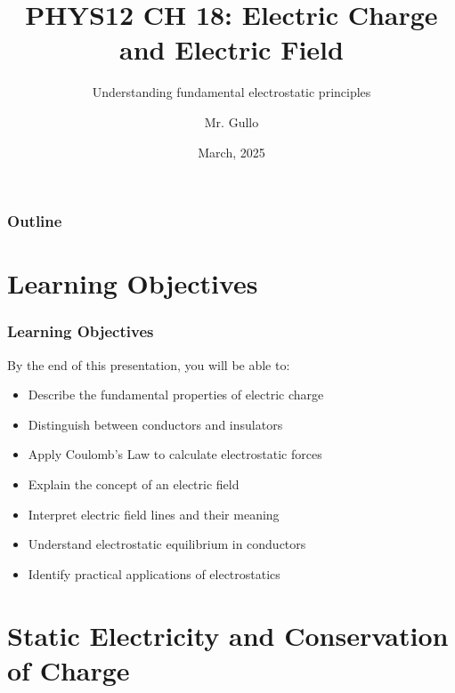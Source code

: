 \documentclass{beamer}
\title[Electric Charge \& Field]{PHYS12 CH 18: Electric Charge and Electric Field}
\subtitle{Understanding fundamental electrostatic principles}
\author[Mr. Gullo]{Mr. Gullo}
\date[Mar 2025]{March, 2025}
\institute{Physics Department}
\begin{document}
\frame{\titlepage}

\begin{frame}
    \frametitle{Outline}
    \tableofcontents
\end{frame}

\section{Learning Objectives}
\begin{frame}
    \frametitle{Learning Objectives}
    
    \begin{block}{By the end of this presentation, you will be able to:}
        \begin{itemize}
            \item Describe the fundamental properties of electric charge
            \item Distinguish between conductors and insulators
            \item Apply Coulomb's Law to calculate electrostatic forces
            \item Explain the concept of an electric field
            \item Interpret electric field lines and their meaning
            \item Understand electrostatic equilibrium in conductors
            \item Identify practical applications of electrostatics
        \end{itemize}
    \end{block}
\end{frame}

\section{Static Electricity and Conservation of Charge}
\end{document}
